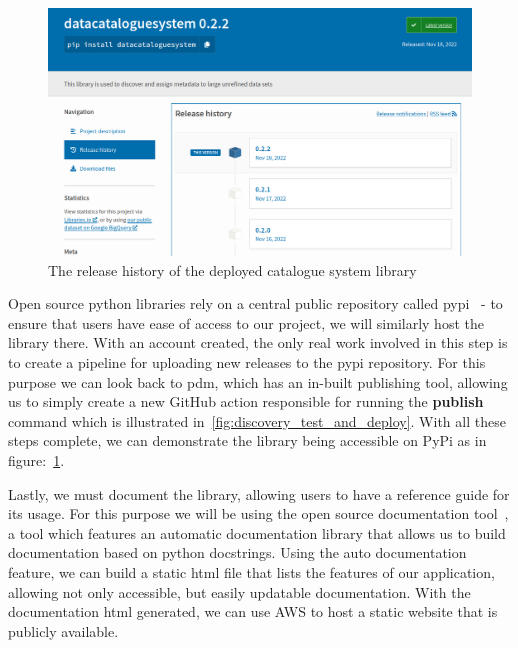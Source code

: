 \begin{figure}[H]
    \centering
    \includegraphics[width=12cm]{figures/discovery_library/pypi_catalogue_upload}
    \caption{The release history of the deployed catalogue system library}
    \label{fig:discovery_pypi_upload}
\end{figure}

Open source python libraries rely on a central public repository called pypi~\cite{pypi} - to ensure that users have
ease of access to our project, we will similarly host the library there.
With an account created, the only real work involved in this step is to create a pipeline for uploading new releases to
the pypi repository.
For this purpose we can look back to pdm, which has an in-built publishing tool, allowing us to simply create a new
GitHub action responsible for running the \textbf{publish} command which is illustrated
in~\ref{fig:discovery_test_and_deploy}.
With all these steps complete, we can demonstrate the library being accessible on PyPi as in
figure:~\ref{fig:discovery_pypi_upload}.

Lastly, we must document the library, allowing users to have a reference guide for its usage.
For this purpose we will be using the open source documentation tool~\cite{sphinx}, a tool which features an automatic
documentation library that allows us to build documentation based on python docstrings.
Using the auto documentation feature, we can build a static html file that lists the features of our application,
allowing not only accessible, but easily updatable documentation.
With the documentation html generated, we can use AWS to host a static website that is publicly available.

